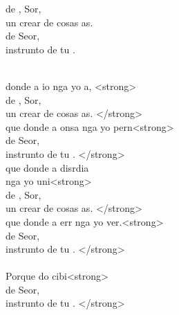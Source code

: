 \begin{cancion}%
	\begin{chorus}%
	 de , Sor,  \\
	un crear de cosas as. \\
	 de  Seor,\\
	instrunto de tu .  \\
	\end{chorus}%
	\jump\\
	 donde a io nga yo a, <strong>\\
	 de , Sor,  \\
	un crear de cosas as. </strong>\\
	que donde a onsa nga yo pern<strong>\\
	 de  Seor,\\
	instrunto de tu . </strong>\\
	que donde a disrdia \\
	nga yo uni<strong>\\
	 de , Sor,  \\
	un crear de cosas as. </strong>\\
	que donde a err nga yo ver.<strong>\\
	 de  Seor,\\
	instrunto de tu . </strong>\\
\jump\\
	Porque do  cibi<strong>\\
	 de  Seor,\\
	instrunto de tu . </strong>\\

\end{cancion}
